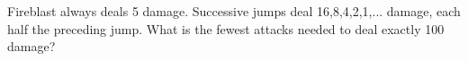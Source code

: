 Fireblast always deals 5 damage. Successive jumps deal 16,8,4,2,1,... damage, each half the preceding jump. What is the fewest attacks needed to deal exactly 100 damage?
